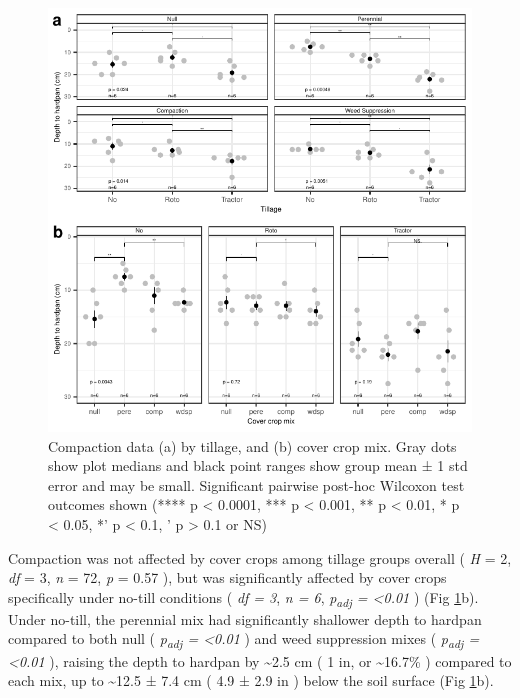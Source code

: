 \documentclass[
  12pt,
]{article}
\begin{document}
\begin{figure}
\centering
\includegraphics{merge_files/figure-latex/compactFig-1.pdf}
\caption{\label{fig:compactFig}Compaction data (a) by tillage, and (b) cover crop mix. Gray dots show plot medians and black point ranges show group mean ± 1 std error and may be small. Significant pairwise post-hoc Wilcoxon test outcomes shown (**** p \textless{} 0.0001, *** p \textless{} 0.001, ** p \textless{} 0.01, * p \textless{} 0.05, *' p \textless{} 0.1, ' p \textgreater{} 0.1 or NS)}
\end{figure}

Compaction was not affected by cover crops among tillage groups overall (
\emph{H} = 2,
\emph{df} = 3,
\emph{n} = 72,
\emph{p} = 0.57
), but was significantly affected by cover crops specifically under no-till conditions (
\emph{df = 3},
\emph{n = 6},
\emph{p\textsubscript{adj} = \textless0.01}
) (Fig \ref{fig:compactFig}b).
Under no-till, the perennial mix had significantly shallower depth to hardpan compared to both null (
\emph{p\textsubscript{adj} = \textless0.01}
) and weed suppression mixes (
\emph{p\textsubscript{adj} = \textless0.01}
),
raising the depth to hardpan by
\textasciitilde2.5 cm (
1 in,
or \textasciitilde16.7\%
) compared to each mix,
up to
\textasciitilde12.5 ±
7.4 cm
(
4.9 ±
2.9 in
) below the soil surface
(Fig \ref{fig:compactFig}b).
\end{document}
